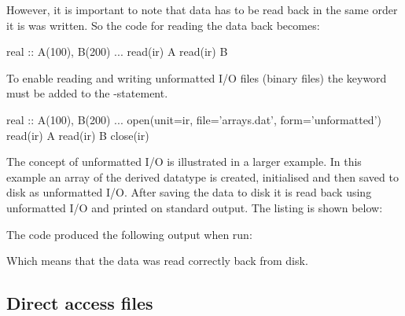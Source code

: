 However, it is important to note that data has to be read back in the same order it is was written. So the code for reading the data back becomes:

\begin{fortrancodeenv}
real :: A(100), B(200)
...
read(ir) A
read(ir) B
\end{fortrancodeenv}

To enable reading and writing unformatted I/O files (binary files) the keyword  must be added to the -statement. 

\begin{fortrancodeenv}
real :: A(100), B(200)
...
open(unit=ir, file='arrays.dat', form='unformatted')
read(ir) A
read(ir) B
close(ir)
\end{fortrancodeenv}

The concept of unformatted I/O is illustrated in a larger example. In this example an array of the derived datatype  is created, initialised and then saved to disk as unformatted I/O. After saving the data to disk it is read back using unformatted I/O and printed on standard output. The listing is shown below:


The code produced the following output when run:

\cmdmode


Which means that the data was read correctly back from disk. 

\subsection{Direct access files}


